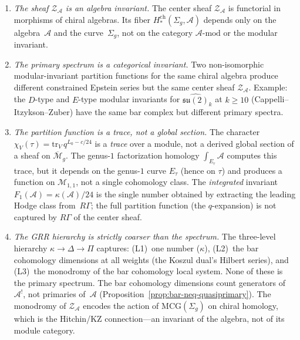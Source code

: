 \documentclass[11pt]{article}
\newcommand{\cA}{\mathcal{A}}
\newcommand{\cM}{\mathcal{M}}
\newcommand{\cZ}{\mathcal{Z}}
\begin{document}
\begin{enumerate}[label=(\roman*)]
\item \emph{The sheaf $\cZ_\cA$ is an algebra invariant.}
  The center sheaf $\cZ_\cA$ is functorial in morphisms of
  chiral algebras.  Its fiber $H^{\mathrm{ch}}_*(\Sigma_g, \cA)$
  depends only on the algebra~$\cA$ and the curve~$\Sigma_g$,
  not on the category $\cA\text{-}\mathrm{mod}$ or the modular
  invariant.

\item \emph{The primary spectrum is a categorical invariant.}
  Two non-isomorphic modular-invariant partition functions for
  the same chiral algebra produce different constrained Epstein
  series but the same center sheaf $\cZ_\cA$.  Example: the
  $D$-type and $E$-type modular invariants for
  $\widehat{\mathfrak{su}(2)}_k$ at $k \geq 10$ (Cappelli--Itzykson--Zuber)
  have the same bar complex but different primary spectra.

\item \emph{The partition function is a trace, not a global section.}
  The character $\chi_V(\tau) = \mathrm{tr}_V\, q^{L_0 - c/24}$
  is a \emph{trace} over a module, not a derived global section
  of a sheaf on $\overline{\cM}_g$.  The genus-$1$ factorization
  homology $\int_{E_\tau} \cA$ computes this trace, but it
  depends on the genus-$1$ curve $E_\tau$ (hence on $\tau$) and
  produces a function on $\mathcal{M}_{1,1}$, not a single
  cohomology class.  The \emph{integrated} invariant
  $F_1(\cA) = \kappa(\cA)/24$ is the single number obtained by
  extracting the leading Hodge class from~$R\Gamma$; the full
  partition function (the $q$-expansion) is not captured by
  $R\Gamma$ of the center sheaf.

\item \emph{The GRR hierarchy is strictly coarser than the spectrum.}
  The three-level hierarchy $\kappa \to \Delta \to \Pi$ captures:
  (L1)~one number ($\kappa$),
  (L2)~the bar cohomology dimensions at all weights (the
  Koszul dual's Hilbert series), and
  (L3)~the monodromy of the bar cohomology local system.
  None of these is the primary spectrum.  The bar cohomology
  dimensions count generators of~$\cA^!$, not primaries of~$\cA$
  (Proposition~\ref{prop:bar-neq-quasiprimary}).  The monodromy
  of $\cZ_\cA$ encodes the action of
  $\mathrm{MCG}(\Sigma_g)$ on chiral homology, which is the
  Hitchin/KZ connection---an invariant of the algebra, not of its
  module category.
\end{enumerate}
\end{document}
